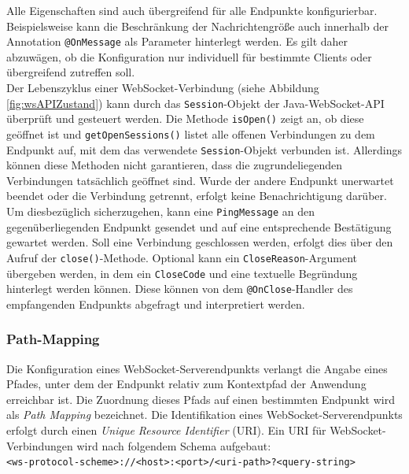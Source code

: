 \documentclass[11pt,a4paper,titlepage]{scrartcl}
\numberwithin{equation}{section}
\begin{document}
\noindent Alle Eigenschaften sind auch übergreifend für alle Endpunkte konfigurierbar. Beispielsweise kann die Beschränkung der Nachrichtengröße auch innerhalb der Annotation \texttt{@OnMessage} als Parameter hinterlegt werden. Es gilt daher abzuwägen, ob die Konfiguration nur individuell für bestimmte Clients oder übergreifend zutreffen soll. \\

\noindent Der Lebenszyklus einer WebSocket-Verbindung (siehe Abbildung \ref{fig:wsAPIZustand}) kann durch das \texttt{Session}-Objekt der Java-WebSocket-API überprüft und gesteuert werden. Die Methode \texttt{isOpen()} zeigt an, ob diese geöffnet ist und \texttt{getOpenSessions()} listet alle offenen Verbindungen zu dem Endpunkt auf, mit dem das verwendete \texttt{Session}-Objekt verbunden ist. Allerdings können diese Methoden nicht garantieren, dass die zugrundeliegenden Verbindungen tatsächlich geöffnet sind. Wurde der andere Endpunkt unerwartet beendet oder die Verbindung getrennt, erfolgt keine Benachrichtigung darüber. Um diesbezüglich sicherzugehen, kann eine \texttt{PingMessage} an den gegenüberliegenden Endpunkt gesendet und auf eine entsprechende Bestätigung gewartet werden. Soll eine Verbindung geschlossen werden, erfolgt dies über den Aufruf der \texttt{close()}-Methode. Optional kann ein \texttt{CloseReason}-Argument übergeben werden, in dem ein \texttt{CloseCode} und eine textuelle Begründung hinterlegt werden können. Diese können von dem \texttt{@OnClose}-Handler des empfangenden Endpunkts abgefragt und interpretiert werden. \\

\subsubsection{Path-Mapping}\label{subsubsec:apiPathMapping}
Die Konfiguration eines WebSocket-Serverendpunkts verlangt die Angabe eines Pfades, unter dem der Endpunkt relativ zum Kontextpfad der Anwendung erreichbar ist. Die Zuordnung dieses Pfads auf einen bestimmten Endpunkt wird als \textit{Path Mapping} bezeichnet. Die Identifikation eines WebSocket-Serverendpunkts erfolgt durch einen \textit{Unique Resource Identifier} (URI). Ein URI für WebSocket-Verbindungen wird nach folgendem Schema aufgebaut:\\

\noindent \texttt{<ws-protocol-scheme>://<host>:<port>/<uri-path>?<query-string>}\\
\end{document}
